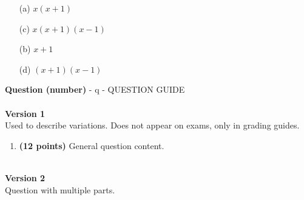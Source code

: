 \documentclass[12pt]{amsart}
\begin{document}
\begin{enumerate}[resume]
\begin{minipage}[t]{1.0\linewidth}\begin{multicols}{2}\begin{itemize}\item[(a)]  $x(x+1)$ \item[(c)]  $x(x+1)(x-1)$ \item[(b)]  $x+1$ \item[(d)]  $(x+1)(x-1)$ \end{itemize}\end{multicols}\end{minipage} \vfill \end{enumerate}\newpage\newpage\def \a{7}\def \atwoone{1}\def \atwotwo{3}\def \atwothree{4}\def \btwothree{6}\def \sumtwothree{10}\def \diftwothree{-2}\def \bigtwothree{400}\def \powtwothree{1296}\def \logtwothree{0.7737056144690831}\def \factortwothree{209}\def \atwofour{1.4}\def \btwofour{1.17}\def \tooshorttwofour{10.1}\def \moneytwofour{10.10}\def \longertwofour{10.10000}\def \atwofive{0.12}\def \btwofive{0.12346}\def \athreeone{5}\def \bthreeone{7}\def \setthreetwo{[2, 5, 6]}\def \athreetwo{2}\def \bthreetwo{5}\def \cthreetwo{6}\def \controlthreethree{-4}\def \athreethree{1}\def \topthreethree{0}\def \athreefour{5}\def \bthreefour{4}\def \listthreefour{[1, 2, 3, 4]}\def \afourone{8}\def \bfourone{-6}\def \fracfourone{\frac{-4}{3}}\def \rootfourtwo{8}\def \simplifiedfourtwo{2 \sqrt{2}}\def \sqrtlistfourtwo{[2, 2]}\def \outfourtwo{2}\def \infourtwo{2}\def \wowfourtwo{1}\def \afourthree{0}\def \nicethreefour{3x^{2}-x^{}}\def \nastythreefour{xyz^{3}}\def \cfourthree{4}\def \dfourthree{-9}\def \infourthree{4x^{}}\def \outfourthree{-9y^{}}\def \afourfour{1597772}\def \nicefourfour{1,597,772}\def \goodfourfour{1,000,000.12345}\def \badfourfour{1,000,000.1}{\Large{\bf Question (number)}} - q - QUESTION GUIDE\\ $ $ \\ {\bf Version 1} \\
Used to describe variations. Does not appear on exams, only in grading guides.
\begin{enumerate}[resume]
\item {\bf (12 points)} 
 General question content.

\vfill 
 \end{enumerate}$ $ \\ {\bf Version 2} \\ 
Question with multiple parts.
\end{document}
